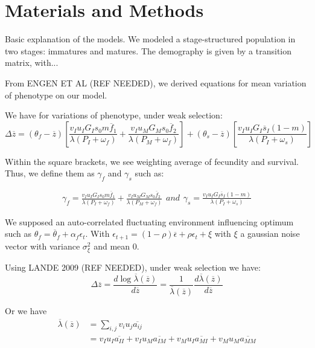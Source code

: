 \section*{Materials and Methods}

Basic explanation of the models. We modeled a stage-structured population in two stages: immatures and matures. The demography is given by a transition matrix, with...

From ENGEN ET AL (REF NEEDED), we derived equations for mean variation of phenotype on our model.

We have for variations of phenotype, under weak selection:
\begin{equation}
\Delta\overline{z} = (\theta_{f} - \overline{z}) \left[ \frac{ v_{I} u_{I} G_{I} s_{0} m \overline{f}_{1} }{\lambda(P_{I}+\omega_{f})} + \frac{ v_{I} u_{M} G_{M} s_{0} \overline{f}_{2}} {\lambda ( P_{M} + \omega_{f} )} \right] + (\theta_{s} - \overline{z}) \left[ \frac{ v_{I} u_{I} G_{I} \overline{s}_{I} (1-m) }{\lambda(P_{I}+\omega_{s})} \right]
\end{equation}

Within the square brackets, we see weighting average of fecundity and survival. Thus, we define them as $\gamma_{f}$ and $\gamma_{s}$ such as:

\begin{subequations}
	\begin{align}
	\gamma_{f} = \frac{ v_{I} u_{I} G_{I} s_{0} m \overline{f}_{1} }{\lambda(P_{I}+\omega_{f})} + \frac{ v_{I} u_{M} G_{M} s_{0} \overline{f}_{2}} {\lambda ( P_{M} + \omega_{f} )}
	\end{align}
	and
	\begin{align}
	\gamma_{s} = \frac{ v_{I} u_{I} G_{I} \overline{s}_{I} (1-m) }{\lambda(P_{I}+\omega_{s})}
	\end{align}
\end{subequations}

We supposed an auto-correlated fluctuating environment influencing optimum such as $\theta_{f} = \overline{\theta}_{f} + \alpha_{f}\epsilon_{t}$. With $\epsilon_{t+1} = (1-\rho)\overline{\epsilon} + \rho\epsilon_{t} + \xi$ with $\xi$ a gaussian noise vector with variance $\sigma^{2}_{\xi}$ and mean $0$.

Using LANDE 2009 (REF NEEDED), under weak selection we have:
\begin{equation}
	\Delta\overline{z} = \frac{d\log\overline{\lambda}(\overline{z})}{d\overline{z}} = \frac{1}{\overline{\lambda}(\overline{z})} \frac{d\overline{\lambda}(\overline{z})}{d\overline{z}}
\end{equation}

Or we have
\begin{align}
	\overline{\lambda}(\overline{z}) &= \sum_{i,j}{v_{i} u_{j} \overline{a_{ij}}}\\
	&= v_{I} u_{I} \overline{a_{II}} + v_{I} u_{M} \overline{a_{IM}} + v_{M} u_{I} \overline{a_{MI}} + v_{M} u_{M} \overline{a_{MM}}
\end{align}